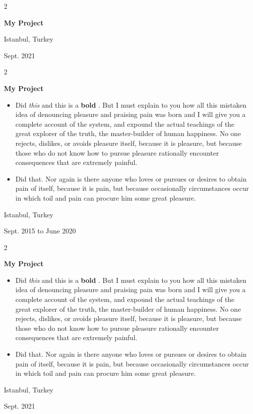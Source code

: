 \documentclass[10pt, letterpaper]{article}
\newenvironment{highlights}{
    \begin{itemize}[
        topsep=0.10 cm,
        parsep=0.10 cm,
        partopsep=0pt,
        itemsep=0pt,
        leftmargin=0.4 cm + 10pt
    ]
}{
    \end{itemize}
} %
\newenvironment{twocolentry}[2][]{
    \onecolentry
    \def\secondColumn{#2}
    \setcolumnwidth{\fill, 4.5 cm}
    \begin{paracol}{2}
}{
    \switchcolumn \raggedleft \secondColumn
    \end{paracol}
    \endonecolentry
} %
\let\hrefWithoutArrow\href
\renewcommand{\href}[2]{\hrefWithoutArrow{#1}{\mbox{\ifthenelse{\equal{#2}{}}{ }{#2 }\raisebox{.15ex}{\footnotesize \faExternalLink*}}}}
\begin{document}
        \vspace{0.2 cm}

        \begin{twocolentry}{
            Istanbul, Turkey

        Sept. 2021
        }
            \textbf{My Project}
        \end{twocolentry}


        \vspace{0.2 cm}

        \begin{twocolentry}{
            Istanbul, Turkey

        Sept. 2015 to June 2020
        }
            \textbf{My Project}
            \begin{highlights}
                \item Did \textit{this} and this is a \textbf{bold} \href{https://example.com}{link}. But I must explain to you how all this mistaken idea of denouncing pleasure and praising pain was born and I will give you a complete account of the system, and expound the actual teachings of the great explorer of the truth, the master-builder of human happiness. No one rejects, dislikes, or avoids pleasure itself, because it is pleasure, but because those who do not know how to pursue pleasure rationally encounter consequences that are extremely painful.
                \item Did that. Nor again is there anyone who loves or pursues or desires to obtain pain of itself, because it is pain, but because occasionally circumstances occur in which toil and pain can procure him some great pleasure.
            \end{highlights}
        \end{twocolentry}


        \vspace{0.2 cm}

        \begin{twocolentry}{
            Istanbul, Turkey

        Sept. 2021
        }
            \textbf{My Project}
            \begin{highlights}
                \item Did \textit{this} and this is a \textbf{bold} \href{https://example.com}{link}. But I must explain to you how all this mistaken idea of denouncing pleasure and praising pain was born and I will give you a complete account of the system, and expound the actual teachings of the great explorer of the truth, the master-builder of human happiness. No one rejects, dislikes, or avoids pleasure itself, because it is pleasure, but because those who do not know how to pursue pleasure rationally encounter consequences that are extremely painful.
                \item Did that. Nor again is there anyone who loves or pursues or desires to obtain pain of itself, because it is pain, but because occasionally circumstances occur in which toil and pain can procure him some great pleasure.
            \end{highlights}
        \end{twocolentry}
\end{document}
